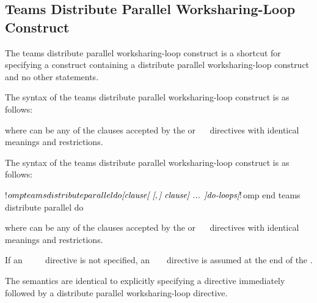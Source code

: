 \subsection{Teams Distribute Parallel Worksharing-Loop Construct}
\label{subsec:Teams Distribute Parallel Worksharing-Loop Construct}
\summary
The teams distribute parallel worksharing-loop construct is a shortcut for 
specifying a  construct containing a distribute parallel worksharing-loop 
construct and no other statements.

\syntax
\begin{ccppspecific}
The syntax of the teams distribute parallel worksharing-loop construct is as follows:

\begin{ompcPragma}[fontsize=\small]
#pragma omp teams distribute parallel for \plc{\}
            \plc{[clause[ [},\plc{] clause] ...  ] new-line}
    \plc{for-loops}
\end{ompcPragma}

where  can be any of the clauses accepted by the  or
~~ directives with identical meanings 
and restrictions.
\end{ccppspecific}

\begin{fortranspecific}
The syntax of the teams distribute parallel worksharing-loop construct is as follows:

\begin{ompfPragma}
!$omp teams distribute parallel do \plc{[clause[ [},\plc{] clause] ... ]}
   \plc{do-loops}
\plc{[} !$omp end teams distribute parallel do \plc{]}
\end{ompfPragma}

where  can be any of the clauses accepted by the  or
~~ directives with identical meanings 
and restrictions.

If an ~~~~ 
directive is not specified, an ~  
~ directive is assumed at the end of the .
\end{fortranspecific}

\descr
The semantics are identical to explicitly specifying a  directive 
immediately followed by a distribute parallel worksharing-loop directive.

